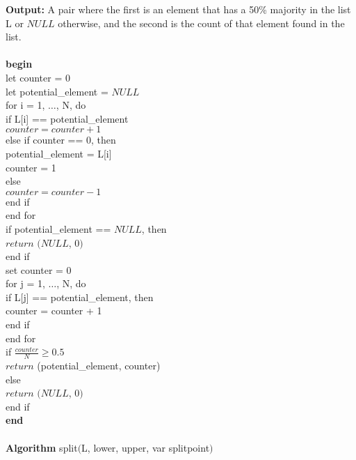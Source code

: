 \documentclass{article}
\begin{document}
      \textbf{Output:} A pair where the first is an element that has a 50\% majority in the list L or $NULL$ otherwise, and the second is the count of that element found in the list. \\
      \\
      \textbf{begin} \\
      \indent let counter = 0 \\
      \indent let potential\_element = $NULL$ \\
      \indent for i = 1, $\ldots$, N, do \\
      \indent\indent if L[i] == potential\_element \\
      \indent\indent\indent $counter = counter + 1$ \\
      \indent\indent else if counter == 0, then \\
      \indent\indent\indent potential\_element = L[i] \\
      \indent\indent\indent counter = 1 \\
      \indent\indent else \\
      \indent\indent\indent $counter = counter - 1$ \\
      \indent\indent end if \\
      \indent end for \\
      \indent if potential\_element == $NULL$, then \\
      \indent\indent $return$ $(NULL$, 0$)$ \\
      \indent end if \\
      \indent set counter = 0 \\
      \indent for j = 1, $\ldots$, N, do \\
      \indent\indent if L[j] == potential\_element, then \\
      \indent\indent\indent counter = counter + 1 \\
      \indent\indent end if \\
      \indent end for \\
      \indent if $\frac{counter}{N} \geq 0.5$ \\
      \indent\indent $return$ (potential\_element, counter) \\
      \indent else \\
      \indent\indent $return$ $(NULL$, 0$)$ \\
      \indent end if \\
      \textbf{end} \\
      \\
      \textbf{Algorithm} split$($L, lower, upper, var splitpoint$)$ \\
\end{document}
